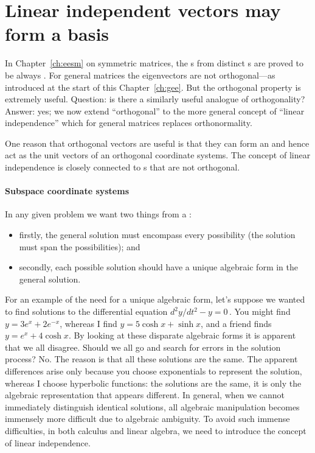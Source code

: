 
\section{Linear independent vectors may form a basis}
\label{sec:lisb}
\secttoc
\begin{comment}
\pooliv{p.92--7,198--208} \holti{\S2.3}
\end{comment}



In Chapter~\ref{ch:eesm} on symmetric matrices, the s from distinct s are proved to be always .  
For general matrices the eigenvectors are not orthogonal---as introduced at the start of this Chapter~\ref{ch:gee}.  
But the orthogonal property is extremely useful.
Question: is there a similarly useful analogue of orthogonality?
Answer: yes; we now extend ``orthogonal'' to the more general concept of ``linear independence'' which for general matrices replaces orthonormality.

One reason that orthogonal vectors are useful is that they can form an  and hence act as the unit vectors of an orthogonal coordinate systems.
The concept of linear independence is closely connected to s that are not orthogonal.



\paragraph{Subspace coordinate systems} In any given problem we want two things from a : 
\begin{itemize}
\item firstly, the general solution must encompass every possibility (the solution must span the possibilities); and 
\item secondly, each possible solution should have a unique algebraic form in the general solution.
\end{itemize}
For an example of the need for a unique algebraic form, let's suppose we wanted to find solutions to the differential equation \(d^2y/dt^2-y=0\)\,. 
You might find \(y=3e^x+2e^{-x}\), whereas I find \(y=5\cosh x+\sinh x\), and a friend finds \(y=e^x+4\cosh x\).
By looking at these disparate algebraic forms it is apparent that we all disagree.
Should we all go and search for errors in the solution process?  No.
The reason is that all these solutions are the same.
The apparent differences arise only because you choose exponentials to represent the solution, whereas I choose hyperbolic functions: the solutions are the same, it is only the algebraic representation that appears different. 
In general, when we cannot immediately distinguish identical solutions, all algebraic manipulation becomes immensely more difficult due to algebraic ambiguity.
To avoid such immense difficulties, in both calculus and linear algebra, we need to introduce the concept of linear independence.

